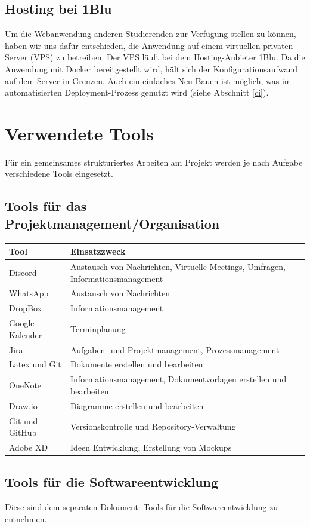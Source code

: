 \documentclass[a4paper,11pt]{scrartcl}
\begin{document}
	\subsection{Hosting bei 1Blu}
Um die Webanwendung anderen Studierenden zur Verfügung stellen zu können, haben wir uns dafür entschieden, die Anwendung auf einem virtuellen privaten Server (VPS) zu betreiben. Der VPS läuft bei dem Hosting-Anbieter 1Blu. 
Da die Anwendung mit Docker bereitgestellt wird, hält sich der Konfigurationsaufwand auf dem Server in Grenzen. Auch ein einfaches Neu-Bauen ist möglich, was im automatisierten Deployment-Prozess genutzt wird (siehe Abschnitt \ref{ci}).

\section{Verwendete Tools}
Für ein gemeinsames strukturiertes Arbeiten am Projekt werden je nach Aufgabe verschiedene Tools eingesetzt. 
	\subsection{Tools für das Projektmanagement/Organisation}
\begin{table}[H]
\begin{tabular}{|p{4cm}|p{8cm}|}
\hline
\textbf{Tool} &\textbf{Einsatzzweck} \\ \hline
Discord &  Austausch von Nachrichten, Virtuelle Meetings, Umfragen, Informationsmanagement\\ \hline
WhatsApp &  Austausch von Nachrichten\\ \hline
DropBox & Informationsmanagement \\ \hline
Google Kalender & Terminplanung   \\ \hline
Jira &  Aufgaben- und Projektmanagement, Prozessmanagement \\ \hline
Latex und Git &  Dokumente erstellen und bearbeiten \\ \hline
OneNote &  Informationsmanagement, Dokumentvorlagen erstellen und bearbeiten \\ \hline
Draw.io &  Diagramme erstellen und bearbeiten \\ \hline
Git und GitHub & Versionskontrolle und Repository-Verwaltung \\ \hline
Adobe XD & Ideen Entwicklung, Erstellung von Mockups \\ \hline
\end{tabular}
\end{table}
	\subsection{Tools für die Softwareentwicklung}
Diese sind dem separaten Dokument: \glqq Tools für die Softwareentwicklung\grqq{} zu entnehmen.
\end{document}
